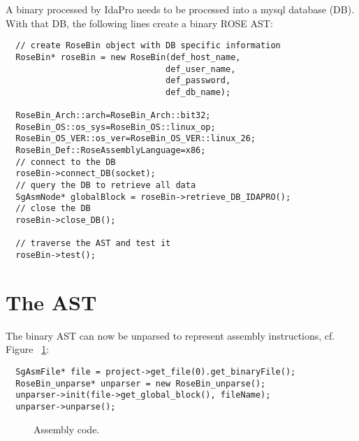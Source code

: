 A binary processed by IdaPro needs to be processed into a mysql database (DB). With that DB,
the following lines create a binary ROSE AST:


{\mySmallFontSize
\begin{verbatim}
  // create RoseBin object with DB specific information 
  RoseBin* roseBin = new RoseBin(def_host_name,
                                def_user_name,
                                def_password,
                                def_db_name);

  RoseBin_Arch::arch=RoseBin_Arch::bit32;
  RoseBin_OS::os_sys=RoseBin_OS::linux_op;
  RoseBin_OS_VER::os_ver=RoseBin_OS_VER::linux_26;
  RoseBin_Def::RoseAssemblyLanguage=x86;
  // connect to the DB
  roseBin->connect_DB(socket);
  // query the DB to retrieve all data
  SgAsmNode* globalBlock = roseBin->retrieve_DB_IDAPRO();
  // close the DB
  roseBin->close_DB();

  // traverse the AST and test it
  roseBin->test();
\end{verbatim}
}




\section{The AST}

The binary AST can now be unparsed to represent assembly instructions, cf. Figure ~\ref{Tutorial:examplesourcecode2}:

{\mySmallFontSize
\begin{verbatim}
  SgAsmFile* file = project->get_file(0).get_binaryFile();
  RoseBin_unparse* unparser = new RoseBin_unparse();
  unparser->init(file->get_global_block(), fileName);
  unparser->unparse();
\end{verbatim}
}


\begin{figure}[!h]
{\indent
{\mySmallFontSize


\begin{latexonly}
   
\end{latexonly}

\begin{htmlonly}
   
\end{htmlonly}

}
}
\caption{Assembly code.}
\label{Tutorial:examplesourcecode2}
\end{figure}


